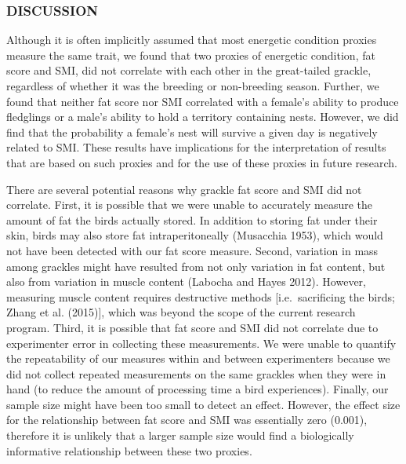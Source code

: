 \documentclass[
]{article}
\begin{document}
\hypertarget{discussion}{%
\subsubsection{DISCUSSION}\label{discussion}}

Although it is often implicitly assumed that most energetic condition
proxies measure the same trait, we found that two proxies of energetic
condition, fat score and SMI, did not correlate with each other in the
great-tailed grackle, regardless of whether it was the breeding or
non-breeding season. Further, we found that neither fat score nor SMI
correlated with a female's ability to produce fledglings or a male's
ability to hold a territory containing nests. However, we did find that
the probability a female's nest will survive a given day is negatively
related to SMI. These results have implications for the interpretation
of results that are based on such proxies and for the use of these
proxies in future research.

There are several potential reasons why grackle fat score and SMI did
not correlate. First, it is possible that we were unable to accurately
measure the amount of fat the birds actually stored. In addition to
storing fat under their skin, birds may also store fat intraperitoneally
(Musacchia 1953), which would not have been detected with our fat score
measure. Second, variation in mass among grackles might have resulted
from not only variation in fat content, but also from variation in
muscle content (Labocha and Hayes 2012). However, measuring muscle
content requires destructive methods {[}i.e.~sacrificing the birds;
Zhang et al. (2015){]}, which was beyond the scope of the current
research program. Third, it is possible that fat score and SMI did not
correlate due to experimenter error in collecting these measurements. We
were unable to quantify the repeatability of our measures within and
between experimenters because we did not collect repeated measurements
on the same grackles when they were in hand (to reduce the amount of
processing time a bird experiences). Finally, our sample size might have
been too small to detect an effect. However, the effect size for the
relationship between fat score and SMI was essentially zero (0.001),
therefore it is unlikely that a larger sample size would find a
biologically informative relationship between these two proxies.
\end{document}
